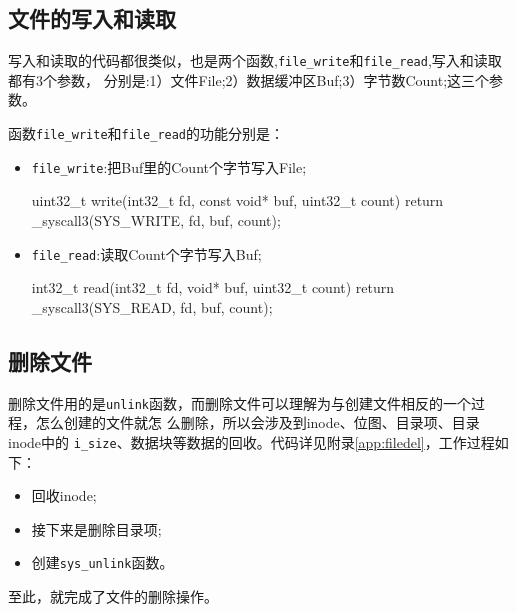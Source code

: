 \subsection{文件的写入和读取}
写入和读取的代码都很类似，也是两个函数,\texttt{file\_write}和\texttt{file\_read},写入和读取都有3个参数，
分别是:1）文件File;2）数据缓冲区Buf;3）字节数Count;这三个参数。

函数\texttt{file\_write}和\texttt{file\_read}的功能分别是：
\begin{itemize}
\item \texttt{file\_write}:把Buf里的Count个字节写入File;
\begin{ccode}
uint32_t write(int32_t fd, const void* buf, uint32_t count)
{
   return _syscall3(SYS_WRITE, fd, buf, count);
}
\end{ccode}
\item \texttt{file\_read}:读取Count个字节写入Buf;
\begin{ccode}
int32_t read(int32_t fd, void* buf, uint32_t count)
{
   return _syscall3(SYS_READ, fd, buf, count);
}
\end{ccode}
\end{itemize}

\subsection{删除文件}

删除文件用的是\texttt{unlink}函数，而删除文件可以理解为与创建文件相反的一个过程，怎么创建的文件就怎
么删除，所以会涉及到inode、位图、目录项、目录inode中的
\texttt{i\_size}、数据块等数据的回收。代码详见附录\ref{app:filedel}，工作过程如下：
\begin{itemize}
\item 回收inode;
\item 接下来是删除目录项;
\item 创建\texttt{sys\_unlink}函数。
\end{itemize}
至此，就完成了文件的删除操作。

